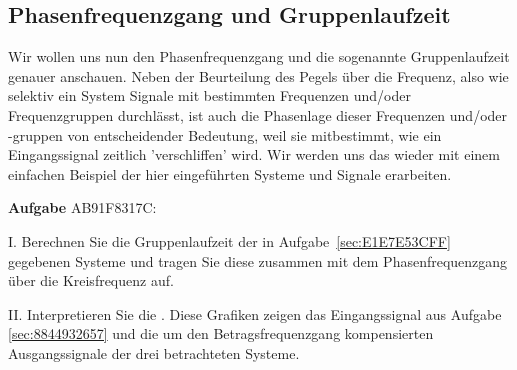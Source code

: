 \subsection{Phasenfrequenzgang und Gruppenlaufzeit}
\label{sec:AB91F8317C}
\begin{Ziel}
Wir wollen uns nun den Phasenfrequenzgang und die sogenannte Gruppenlaufzeit
genauer anschauen. Neben der Beurteilung des Pegels über die Frequenz,
also wie selektiv ein System Signale mit bestimmten Frequenzen und/oder
Frequenzgruppen durchlässt, ist auch die Phasenlage dieser Frequenzen und/oder
-gruppen von entscheidender Bedeutung, weil sie mitbestimmt, wie ein Eingangssignal
zeitlich 'verschliffen' wird.
Wir werden uns das wieder mit einem einfachen Beispiel der hier eingeführten
Systeme und Signale erarbeiten.
\end{Ziel}
\textbf{Aufgabe} {\tiny AB91F8317C}:

\noindent I. Berechnen Sie die Gruppenlaufzeit
der in Aufgabe~\ref{sec:E1E7E53CFF} gegebenen Systeme und
tragen Sie diese zusammen mit dem Phasenfrequenzgang über die Kreisfrequenz auf.

\noindent II. Interpretieren Sie die . Diese Grafiken
zeigen das Eingangssignal aus Aufgabe \ref{sec:8844932657} und die um den
Betragsfrequenzgang kompensierten Ausgangssignale der drei betrachteten
Systeme.

